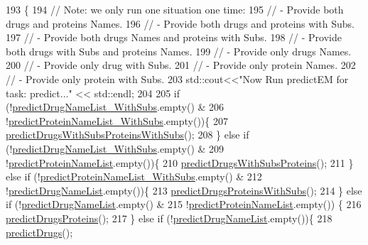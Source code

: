 \begin{DoxyCode}
193                    \{
194     \textcolor{comment}{// Note: we only run one situation one time:}
195     \textcolor{comment}{// - Provide both drugs and proteins Names.}
196     \textcolor{comment}{// - Provide both drugs and proteins with Subs.}
197     \textcolor{comment}{// - Provide both drugs Names and proteins with Subs.}
198     \textcolor{comment}{// - Provide both drugs with Subs and proteins Names.}
199     \textcolor{comment}{// - Provide only drugs Names.}
200     \textcolor{comment}{// - Provide only drug with Subs.}
201     \textcolor{comment}{// - Provide only protein Names.}
202     \textcolor{comment}{// - Provide only protein with Subs.}
203     std::cout<<\textcolor{stringliteral}{"Now Run predictEM for task: predict..."} << std::endl;
204 
205     \textcolor{keywordflow}{if} (!\hyperlink{namespacegift_a85bd1982c5b60a7cf09a0f80398bb051}{predictDrugNameList\_WithSubs}.empty() &
206         !\hyperlink{namespacegift_a03aaa96d826b6a887accc3951939ccde}{predictProteinNameList\_WithSubs}.empty())\{
207       \hyperlink{classgift_1_1_e_m_abb44eb68c4695bf9badf26c72f6c1ebd}{predictDrugsWithSubsProteinsWithSubs}();
208     \}  \textcolor{keywordflow}{else} \textcolor{keywordflow}{if} (!\hyperlink{namespacegift_a85bd1982c5b60a7cf09a0f80398bb051}{predictDrugNameList\_WithSubs}.empty() &
209         !\hyperlink{namespacegift_a03bb78fc438e2b1af29ff3b46b70a085}{predictProteinNameList}.empty())\{
210       \hyperlink{classgift_1_1_e_m_a1d026fdafa17cd3237dd720dd5ce0a28}{predictDrugsWithSubsProteins}();
211     \} \textcolor{keywordflow}{else} \textcolor{keywordflow}{if} (!\hyperlink{namespacegift_a03aaa96d826b6a887accc3951939ccde}{predictProteinNameList\_WithSubs}.empty() &
212         !\hyperlink{namespacegift_a9cc6da68eeea28ac6c6a65cd9f248e5b}{predictDrugNameList}.empty())\{
213       \hyperlink{classgift_1_1_e_m_a22ea8f4791a6d58d8b1ffa85f49c6757}{predictDrugsProteinsWithSubs}();
214     \} \textcolor{keywordflow}{else} \textcolor{keywordflow}{if} (!\hyperlink{namespacegift_a9cc6da68eeea28ac6c6a65cd9f248e5b}{predictDrugNameList}.empty() &
215         !\hyperlink{namespacegift_a03bb78fc438e2b1af29ff3b46b70a085}{predictProteinNameList}.empty()) \{
216       \hyperlink{classgift_1_1_e_m_a3071ab56b24724f241f98ce983d52b6e}{predictDrugsProteins}();
217     \} \textcolor{keywordflow}{else} \textcolor{keywordflow}{if} (!\hyperlink{namespacegift_a9cc6da68eeea28ac6c6a65cd9f248e5b}{predictDrugNameList}.empty())\{
218       \hyperlink{classgift_1_1_e_m_aed05c6829e19e981628d8a514a766cab}{predictDrugs}();

\end{DoxyCode}
